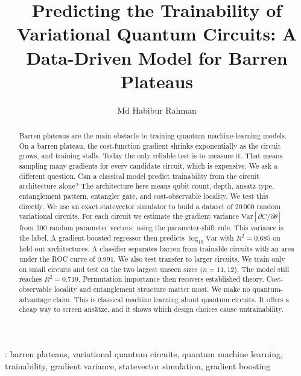 \documentclass[12pt]{iopart}
\newcommand{\Nrows}{20\,000}
\newcommand{\Samples}{200}
\newcommand{\RsqHold}{0.685}
\newcommand{\AucHold}{0.991}
\newcommand{\RsqExtrap}{0.719}
\begin{document}
\title{Predicting the Trainability of Variational Quantum Circuits:
A Data-Driven Model for Barren Plateaus}

\author{Md Habibur Rahman}

\address{Department of AI Convergence Engineering, Gyeongsang National
University, Jinju, Republic of Korea}


\begin{abstract}
Barren plateaus are the main obstacle to training quantum machine-learning
models. On a barren plateau, the cost-function gradient shrinks exponentially as
the circuit grows, and training stalls. Today the only reliable test is to
measure it. That means sampling many gradients for every candidate circuit,
which is expensive. We ask a different question. Can a classical model predict
trainability from the circuit architecture alone? The architecture here means
qubit count, depth, ansatz type, entanglement pattern, entangler gate, and
cost-observable locality. We test this directly. We use an exact statevector
simulator to build a dataset of \Nrows{} random variational circuits. For each
circuit we estimate the gradient variance
$\mathrm{Var}[\partial C/\partial\theta]$ from \Samples{} random parameter
vectors, using the parameter-shift rule. This variance is the label. A
gradient-boosted regressor then predicts $\log_{10}\mathrm{Var}$ with
$R^2 = \RsqHold{}$ on held-out architectures. A classifier separates barren from
trainable circuits with an area under the ROC curve of \AucHold{}. We also test
transfer to larger circuits. We train only on small circuits and test on the two
largest unseen sizes ($n=11,12$). The model still reaches $R^2 = \RsqExtrap{}$.
Permutation importance then recovers established theory. Cost-observable
locality and entanglement structure matter most. We make no quantum-advantage
claim. This is classical machine learning about quantum circuits. It offers a
cheap way to screen ans\"atze, and it shows which design choices cause
untrainability.
\end{abstract}

: barren plateaus, variational quantum circuits, quantum
machine learning, trainability, gradient variance, statevector simulation,
gradient boosting

\submitto{\QST}

\maketitle
\end{document}
